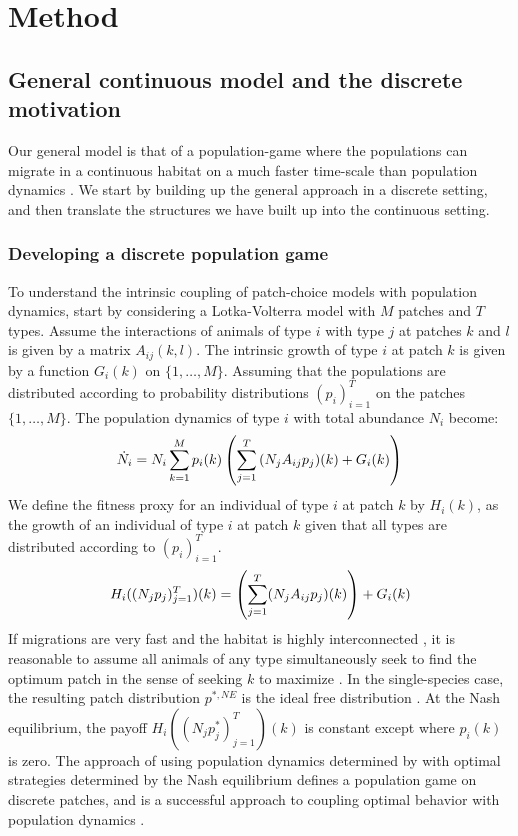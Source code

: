 \section{Method}

\subsection{General continuous model and the discrete motivation}
\label{sec:gen_model}

Our general model is that of a population-game \citep{kvrivan2009evolutionary} where the populations can migrate in a continuous habitat on a much faster time-scale than population dynamics \citep{cressman2006migration}. We start by building up the general approach in a discrete setting, and then translate the structures we have built up into the continuous setting.

\subsubsection{Developing a discrete population game}
To understand the intrinsic coupling of patch-choice models with population dynamics, start by considering a Lotka-Volterra model with $M$ patches and $T$ types. Assume the interactions of animals of type $i$ with type $j$ at patches $k$ and $l$ is given by a matrix $A_{ij}(k,l)$. The intrinsic growth of type $i$ at patch $k$ is given by a function $G_{i}(k)$ on $\{1,\dots,M\}$. Assuming that the populations are distributed according to probability distributions $(p_i)_{i=1}^T$ on the patches $\{1,\ldots,M\}$. The population dynamics of type $i$ with total abundance $N_i$ become:
  \begin{equation}
  \dot{N}_i = N_i \sum_{k=1}^M p_i(k) \left ( \sum_{j=1}^T {(N_j A_{ij} p_j)}(k) + G_i(k) \right )
  \label{eq:pop_dyn_lv}
\end{equation}
We define the fitness proxy for an individual of type $i$ at patch $k$ by $H_i(k)$, as the growth of an individual of type $i$ at patch $k$ given that all types are distributed according to $(p_i)_{i=1}^T$.
\begin{equation}
  H_i((N_j p_j)_{j=1}^T)(k) = \pa{\sum_{j=1}^T (N_j A_{ij}p_j)(k)} + G_i(k)%
  \label{eq:utility_pm}
\end{equation}
If migrations are very fast and the habitat is highly interconnected \citep{cressman2006migration, abrams2007role}, it is reasonable to assume all animals of any type simultaneously seek to find the optimum patch in the sense of seeking $k$ to maximize . In the single-species case, the resulting patch distribution $p^{*,NE}$ is the ideal free distribution \citep{fretwell1969territorial}. At the Nash equilibrium, the payoff $H_i((N_j p_j^*)_{j=1}^T)(k)$ is constant except where $p_i(k)$ is zero. The approach of using population dynamics determined by  with optimal strategies determined by the Nash equilibrium defines a population game on discrete patches, and is a successful approach to coupling optimal behavior with population dynamics \citep{valdovinos2010consequences, mougi2019adaptive, pinti2021co}.


